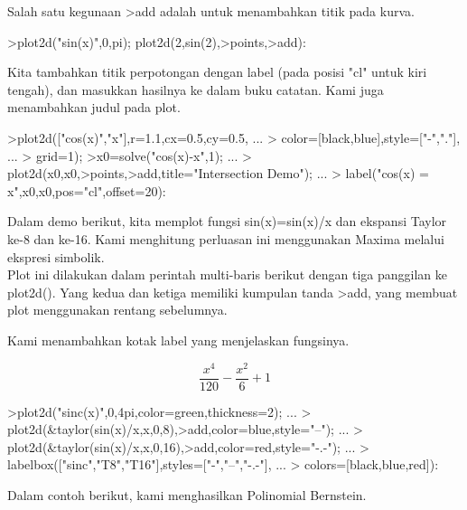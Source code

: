 \documentclass{article}
\begin{document}
\begin{eulernotebook}
\begin{eulercomment}
\begin{eulercomment}
\begin{eulercomment}
\begin{eulercomment}
\begin{eulercomment}
\begin{eulercomment}
\begin{eulercomment}
Salah satu kegunaan \textgreater{}add adalah untuk menambahkan titik pada kurva.
\end{eulercomment}
\begin{eulerprompt}
>plot2d("sin(x)",0,pi); plot2d(2,sin(2),>points,>add):
\end{eulerprompt}
\begin{eulercomment}
Kita tambahkan titik perpotongan dengan label (pada posisi "cl" untuk
kiri tengah), dan masukkan hasilnya ke dalam buku catatan. Kami juga
menambahkan judul pada plot.
\end{eulercomment}
\begin{eulerprompt}
>plot2d(["cos(x)","x"],r=1.1,cx=0.5,cy=0.5, ...
>  color=[black,blue],style=["-","."], ...
>  grid=1);
>x0=solve("cos(x)-x",1);  ...
>  plot2d(x0,x0,>points,>add,title="Intersection Demo");  ...
>  label("cos(x) = x",x0,x0,pos="cl",offset=20):
\end{eulerprompt}
\begin{eulercomment}
Dalam demo berikut, kita memplot fungsi sin(x)=sin(x)/x dan ekspansi
Taylor ke-8 dan ke-16. Kami menghitung perluasan ini menggunakan
Maxima melalui ekspresi simbolik.\\
Plot ini dilakukan dalam perintah multi-baris berikut dengan tiga
panggilan ke plot2d(). Yang kedua dan ketiga memiliki kumpulan tanda
\textgreater{}add, yang membuat plot menggunakan rentang sebelumnya.

Kami menambahkan kotak label yang menjelaskan fungsinya.
\end{eulercomment}
\begin{eulerformula}
\[
\frac{x^4}{120}-\frac{x^2}{6}+1
\]
\end{eulerformula}
\begin{eulerprompt}
>plot2d("sinc(x)",0,4pi,color=green,thickness=2); ...
>  plot2d(&taylor(sin(x)/x,x,0,8),>add,color=blue,style="--"); ...
>  plot2d(&taylor(sin(x)/x,x,0,16),>add,color=red,style="-.-"); ...
>  labelbox(["sinc","T8","T16"],styles=["-","--","-.-"], ...
>    colors=[black,blue,red]):
\end{eulerprompt}
\begin{eulercomment}
Dalam contoh berikut, kami menghasilkan Polinomial Bernstein.


\end{eulercomment}
\end{eulercomment}
\end{eulercomment}
\end{eulercomment}
\end{eulercomment}
\end{eulercomment}
\end{eulercomment}
\end{eulernotebook}
\end{document}
